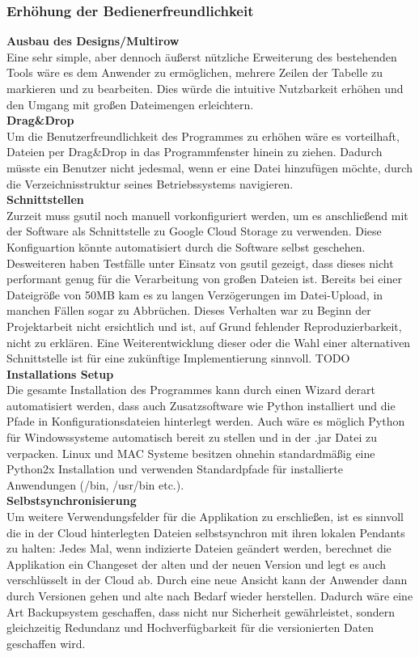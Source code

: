 \documentclass[12pt,a4paper,bibliography=totocnumbered,listof=totocnumbered]{scrartcl}
\begin{document}
\subsubsection{Erhöhung der Bedienerfreundlichkeit}
\textbf{Ausbau des Designs/Multirow}\\
Eine sehr simple, aber dennoch äußerst nützliche Erweiterung des bestehenden Tools wäre es dem Anwender zu ermöglichen, mehrere Zeilen der Tabelle zu markieren und zu bearbeiten. Dies würde die intuitive Nutzbarkeit erhöhen und den Umgang mit großen Dateimengen erleichtern. 
\\\textbf{Drag\&Drop}\\
Um die Benutzerfreundlichkeit des Programmes zu erhöhen wäre es vorteilhaft, Dateien per Drag\&Drop in das Programmfenster hinein zu ziehen. Dadurch müsste ein Benutzer nicht jedesmal, wenn er eine Datei hinzufügen möchte, durch die Verzeichnisstruktur seines Betriebssystems navigieren.
\\\textbf{Schnittstellen}\\
Zurzeit muss gsutil noch manuell vorkonfiguriert werden, um es anschließend mit der Software als Schnittstelle zu Google Cloud Storage zu verwenden. Diese Konfiguartion könnte automatisiert durch die Software selbst geschehen. Desweiteren haben Testfälle unter Einsatz von gsutil gezeigt, dass dieses nicht performant genug für die Verarbeitung von großen Dateien ist. Bereits bei einer Dateigröße von 50MB kam es zu langen Verzögerungen im Datei-Upload, in manchen Fällen sogar zu Abbrüchen. Dieses Verhalten war zu Beginn der Projektarbeit nicht ersichtlich und ist, auf Grund fehlender Reproduzierbarkeit, nicht zu erklären. Eine Weiterentwicklung dieser oder die Wahl einer alternativen Schnittstelle ist für eine zukünftige Implementierung sinnvoll. TODO
\\\textbf{Installations Setup}\\
Die gesamte Installation des Programmes kann durch einen Wizard derart automatisiert werden, dass auch Zusatzsoftware wie Python installiert und die Pfade in Konfigurationsdateien hinterlegt werden. Auch wäre es möglich Python für Windowssysteme automatisch bereit zu stellen und in der .jar Datei zu verpacken. Linux und MAC Systeme besitzen ohnehin standardmäßig eine Python2x Installation und verwenden Standardpfade für installierte Anwendungen (/bin, /usr/bin etc.).
\\\textbf{Selbstsynchronisierung}\\
Um weitere Verwendungsfelder für die Applikation zu erschließen, ist es sinnvoll die in der Cloud hinterlegten Dateien selbstsynchron mit ihren lokalen Pendants zu halten: Jedes Mal, wenn indizierte Dateien geändert werden, berechnet die Applikation ein Changeset der alten und der neuen Version und legt es auch verschlüsselt in der Cloud ab. Durch eine neue Ansicht kann der Anwender dann durch Versionen gehen und alte nach Bedarf wieder herstellen. Dadurch wäre eine Art Backupsystem geschaffen, dass nicht nur Sicherheit gewährleistet, sondern gleichzeitig Redundanz und Hochverfügbarkeit für die versionierten Daten geschaffen wird.
\end{document}
